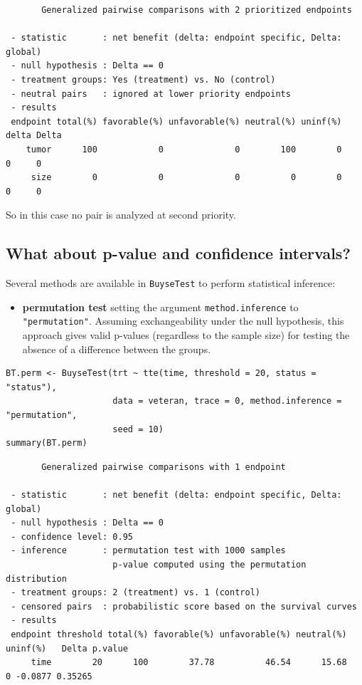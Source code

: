 \documentclass[12pt]{article}
\begin{document}
\begin{verbatim}
       Generalized pairwise comparisons with 2 prioritized endpoints

 - statistic       : net benefit (delta: endpoint specific, Delta: global) 
 - null hypothesis : Delta == 0 
 - treatment groups: Yes (treatment) vs. No (control) 
 - neutral pairs   : ignored at lower priority endpoints
 - results
 endpoint total(%) favorable(%) unfavorable(%) neutral(%) uninf(%) delta Delta
    tumor      100            0              0        100        0     0     0
     size        0            0              0          0        0     0     0
\end{verbatim}

So in this case no pair is analyzed at second priority.

\clearpage

\subsection{What about p-value and confidence intervals?}
\label{sec:org4598fce}

Several methods are available in \texttt{BuyseTest} to perform statistical inference:
\begin{itemize}
\item \textbf{permutation test} setting the argument \texttt{method.inference} to
\texttt{"permutation"}. Assuming exchangeability under the null hypothesis,
this approach gives valid p-values (regardless to the sample size)
for testing the absence of a difference between the groups.
\end{itemize}
\lstset{language=r,label= ,caption= ,captionpos=b,numbers=none}
\begin{lstlisting}
BT.perm <- BuyseTest(trt ~ tte(time, threshold = 20, status = "status"),
                     data = veteran, trace = 0, method.inference = "permutation",
                     seed = 10) 
summary(BT.perm)
\end{lstlisting}

\begin{verbatim}
       Generalized pairwise comparisons with 1 endpoint

 - statistic       : net benefit (delta: endpoint specific, Delta: global) 
 - null hypothesis : Delta == 0 
 - confidence level: 0.95 
 - inference       : permutation test with 1000 samples 
                     p-value computed using the permutation distribution 
 - treatment groups: 2 (treatment) vs. 1 (control) 
 - censored pairs  : probabilistic score based on the survival curves
 - results
 endpoint threshold total(%) favorable(%) unfavorable(%) neutral(%) uninf(%)   Delta p.value 
     time        20      100        37.78          46.54      15.68        0 -0.0877 0.35265
\end{verbatim}
\end{document}
